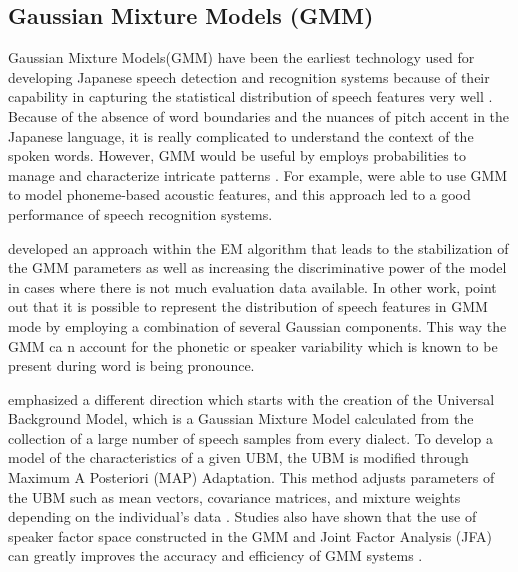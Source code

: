 \subsection{Gaussian Mixture Models (GMM)}
Gaussian Mixture Models(GMM) have been the earliest technology used for developing Japanese speech detection and recognition systems because of their capability in capturing the statistical distribution of speech features very well \parencite{Imaishi2022Examination}. Because of the absence of word boundaries and the nuances of pitch accent in the Japanese language, it is really complicated to understand the context of the spoken words. However, GMM would be useful by employs probabilities to manage and characterize intricate patterns \parencite{sun2020subspace}. For example, \textcite{povey2011subspace} were able to use GMM to model phoneme-based acoustic features, and this approach led to a good performance of speech recognition systems.

 \parencite{Imaishi2022Examination} developed an approach within the EM algorithm that leads to the stabilization of the GMM parameters as well as increasing the discriminative power of the model in cases where there is not much evaluation data available. In other work, \textcite{povey2011subspace} point out that it is possible to represent the distribution of speech features in GMM mode by employing a combination of several Gaussian components. This way the GMM ca n account for the phonetic or speaker variability which is known to be present during word is being pronounce.

\textcite{Takami2020Performance} emphasized a different direction which starts with the creation of the Universal Background Model, which is a Gaussian Mixture Model calculated from the collection of a large number of speech samples from every dialect. To develop a model of the characteristics of a given UBM, the UBM is modified through Maximum A Posteriori (MAP) Adaptation. This method adjusts parameters of the UBM such as mean vectors, covariance matrices, and mixture weights depending on the individual’s data \parencite{dehak2009support}. Studies also  have shown that the use of speaker factor space constructed in the GMM and Joint Factor Analysis (JFA) can greatly improves the accuracy and efficiency of GMM systems \parencite{matrouf2011modeling}.

